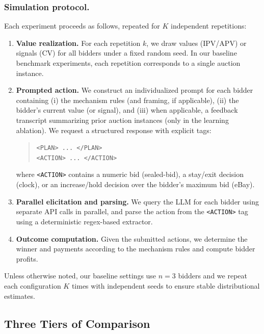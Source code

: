 \documentclass{article} %
\newif\ifmarkrev
\newcommand{\rev}[1]{\ifmarkrev\begingroup\color{red}#1\endgroup\else#1\fi}
\begin{document}
\subsubsection{Simulation protocol.}
Each experiment proceeds as follows, repeated for $K$ independent repetitions:
\begin{enumerate}
    \item \textbf{Value realization.} For each repetition $k$, we draw values (IPV/APV) or signals (CV) for all bidders under a fixed random seed. In our baseline benchmark experiments, each repetition corresponds to a single auction instance.
    \item \textbf{Prompted action.} We construct an individualized prompt for each bidder containing (i) the mechanism rules (and framing, if applicable), (ii) the bidder's current value (or signal), and (iii) when applicable, a feedback transcript summarizing prior auction instances (only in the learning ablation). We request a structured response with explicit tags:
\begin{quote}\small
\verb|<PLAN> ... </PLAN>| \\
\verb|<ACTION> ... </ACTION>|
\end{quote}
where \verb|<ACTION>| contains a numeric bid (sealed-bid), a stay/exit decision (clock), or an increase/hold decision over the bidder's maximum bid (eBay).
    \item \textbf{Parallel elicitation and parsing.} We query the LLM for each bidder using separate API calls in parallel, and parse the action from the \verb|<ACTION>| tag using a deterministic regex-based extractor.
    \item \textbf{Outcome computation.} Given the submitted actions, we determine the winner and payments according to the mechanism rules and compute bidder profits.
\end{enumerate}

Unless otherwise noted, our baseline settings use $n=3$ bidders and we repeat each configuration $K$ times with independent seeds to ensure stable distributional estimates.


\subsection{\texorpdfstring{\rev{Three Tiers of Comparison}}{Three Tiers of Comparison}}\label{sec:tiers}
\end{document}
